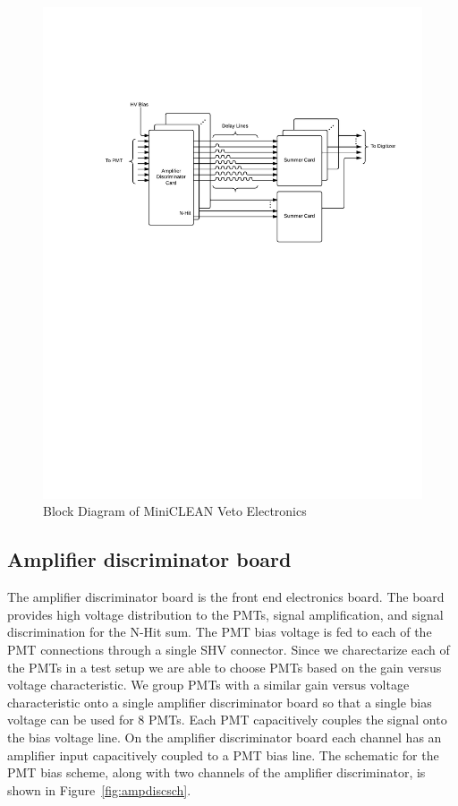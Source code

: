 \documentclass[review,number,sort&compress]{elsarticle}
\begin{document}
\begin{figure}[ht]
\begin{center}
\includegraphics[width=5in, keepaspectratio=true, trim=1.25in 5.75in 0.5in 2in, clip=true]{graphics/block.pdf}
\caption{Block Diagram of MiniCLEAN Veto Electronics
\label{fig:block_diagram}}
\end{center}
\end{figure}

\subsection{Amplifier discriminator board}
\label{sec:Amp-Disc}
%
The amplifier discriminator board is the front end electronics board.
The board provides high voltage distribution to the PMTs, signal
amplification, and signal discrimination for the N-Hit sum. The PMT
bias voltage is fed to each of the PMT connections through a single
SHV connector. Since we charectarize each of the PMTs in a test setup we
are able to choose PMTs based on the gain versus voltage characteristic.
We group PMTs with a similar gain versus voltage characteristic onto a
single amplifier discriminator board so that a single bias voltage can be
used for 8 PMTs. Each PMT capacitively couples the signal onto the bias
voltage line. On the amplifier discriminator board each channel has
an amplifier input capacitively coupled to a PMT bias line. The schematic for the
PMT bias scheme, along with two channels of the amplifier discriminator, is shown in Figure~\ref{fig:ampdiscsch}.
\end{document}
